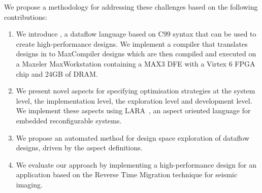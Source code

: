 We propose a methodology for addressing these challenges based on the
following contributions:
\begin{enumerate}
\item We introduce \MAXC{}, a dataflow language based on C99 syntax
  that can be used to create high-performance designs. We implement a
  compiler that translates designs in \MAXC{} to MaxCompiler
  \cite{5719584} designs which are then compiled and executed on a
  Maxeler MaxWorkstation containing a MAX3 DFE with a Virtex 6 FPGA chip
  and 24GB of DRAM.
\item We present novel aspects for specifying optimisation
  strategies at the system level, the implementation level, the
  exploration level and development level. We implement these aspects
  using
  LARA~\cite{Cardoso:Carvalho:Cutinho:Luk:Nobre:Diniz:Petrov:2012}, an
  aspect oriented language for embedded reconfigurable systems.
\item We propose an automated method for design space exploration of
  \MAXC{} dataflow designs, driven by the aspect definitions.
\item We evaluate our approach by implementing a high-performance
  design for an application based on the Reverse Time Migration
  technique for seismic imaging.
\end{enumerate}
